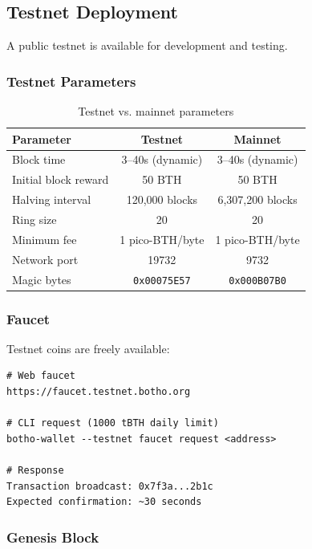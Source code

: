 \subsection{Testnet Deployment}

A public testnet is available for development and testing.

\subsubsection{Testnet Parameters}

\begin{table}[h]
\centering
\caption{Testnet vs. mainnet parameters}
\label{tab:testnet-params}
\begin{tabular}{@{}lcc@{}}
\toprule
\textbf{Parameter} & \textbf{Testnet} & \textbf{Mainnet} \\
\midrule
Block time & 3--40s (dynamic) & 3--40s (dynamic) \\
Initial block reward & 50 BTH & 50 BTH \\
Halving interval & 120{,}000 blocks & 6{,}307{,}200 blocks \\
Ring size & 20 & 20 \\
Minimum fee & 1 pico-BTH/byte & 1 pico-BTH/byte \\
Network port & 19732 & 9732 \\
Magic bytes & \texttt{0x00075E57} & \texttt{0x000B07B0} \\
\bottomrule
\end{tabular}
\end{table}

\subsubsection{Faucet}

Testnet coins are freely available:

\begin{lstlisting}[caption={Faucet usage}]
# Web faucet
https://faucet.testnet.botho.org

# CLI request (1000 tBTH daily limit)
botho-wallet --testnet faucet request <address>

# Response
Transaction broadcast: 0x7f3a...2b1c
Expected confirmation: ~30 seconds
\end{lstlisting}

\subsubsection{Genesis Block}

